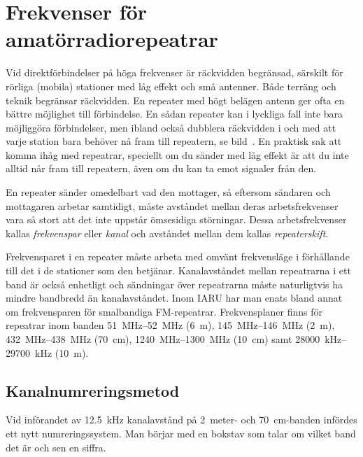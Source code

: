 \chapter[Svenska repeatrar]{Frekvenser för amatörradiorepeatrar}
\label{svenska repeatrar}

\noindent Vid direktförbindelser på höga frekvenser är räckvidden begränsad,
särskilt för rörliga (mobila) stationer med låg effekt och små antenner.
Både terräng och teknik begränsar räckvidden.
En repeater med högt belägen antenn ger ofta en bättre möjlighet till förbindelse.
En sådan repeater kan i lyckliga fall inte bara möjliggöra förbindelser, men
ibland också dubblera räckvidden i och med att varje station bara
behöver nå fram till repeatern, se bild~.
En praktisk sak att komma ihåg med repeatrar, speciellt om du sänder med låg
effekt är att du inte alltid når fram till repeatern, även om du kan ta emot
signaler från den.

En repeater sänder omedelbart vad den mottager, så eftersom sändaren och
mottagaren arbetar samtidigt, måste avståndet mellan deras arbetsfrekvenser vara
så stort att det inte uppstår ömsesidiga störningar.
Dessa arbetsfrekvenser kallas \emph{frekvenspar} eller \emph{kanal} och avståndet
mellan dem kallas \emph{repeaterskift}.

Frekvensparet i en repeater måste arbeta med omvänt frekvensläge i förhållande
till det i de stationer som den betjänar.
Kanalavståndet mellan repeatrarna i ett band är också enhetligt och sändningar
över repeatrarna måste naturligtvis ha mindre bandbredd än kanalavståndet.
Inom IARU har man enats bland annat om frekvensparen för smalbandiga
FM-repeatrar.
Frekvensplaner finns för repeatrar inom banden \SIrange{51}{52}{\mega\hertz}
(\qty{6}{\metre}), \SIrange{145}{146}{\mega\hertz} (\qty{2}{\metre}),
\SIrange{432}{438}{\mega\hertz} (\qty{70}{\centi\metre}),
\SIrange{1240}{1300}{\mega\hertz} (\qty{10}{\centi\metre}) samt
\SIrange{28000}{29700}{\kilo\hertz} (\qty{10}{\metre}).

\section{Kanalnumreringsmetod}
Vid införandet av \qty{12,5}{\kilo\hertz} kanalavstånd på 2~meter- och
\qty{70}{\centi\metre}-banden infördes ett nytt numreringssystem.
Man börjar med en bokstav som talar om vilket band det är och sen en siffra.

